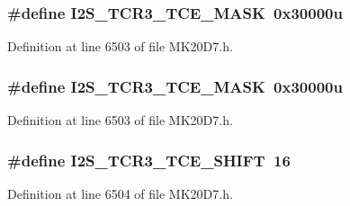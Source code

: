 \subsubsection[{\texorpdfstring{I2\+S\+\_\+\+T\+C\+R3\+\_\+\+T\+C\+E\+\_\+\+M\+A\+SK}{I2S_TCR3_TCE_MASK}}]{\setlength{\rightskip}{0pt plus 5cm}\#define I2\+S\+\_\+\+T\+C\+R3\+\_\+\+T\+C\+E\+\_\+\+M\+A\+SK~0x30000u}\hypertarget{group___i2_s___register___masks_ga27bcb7b4d391b96f7fd8f566579bf7e2}{}\label{group___i2_s___register___masks_ga27bcb7b4d391b96f7fd8f566579bf7e2}


Definition at line 6503 of file M\+K20\+D7.\+h.

\subsubsection[{\texorpdfstring{I2\+S\+\_\+\+T\+C\+R3\+\_\+\+T\+C\+E\+\_\+\+M\+A\+SK}{I2S_TCR3_TCE_MASK}}]{\setlength{\rightskip}{0pt plus 5cm}\#define I2\+S\+\_\+\+T\+C\+R3\+\_\+\+T\+C\+E\+\_\+\+M\+A\+SK~0x30000u}\hypertarget{group___i2_s___register___masks_ga27bcb7b4d391b96f7fd8f566579bf7e2}{}\label{group___i2_s___register___masks_ga27bcb7b4d391b96f7fd8f566579bf7e2}


Definition at line 6503 of file M\+K20\+D7.\+h.

\subsubsection[{\texorpdfstring{I2\+S\+\_\+\+T\+C\+R3\+\_\+\+T\+C\+E\+\_\+\+S\+H\+I\+FT}{I2S_TCR3_TCE_SHIFT}}]{\setlength{\rightskip}{0pt plus 5cm}\#define I2\+S\+\_\+\+T\+C\+R3\+\_\+\+T\+C\+E\+\_\+\+S\+H\+I\+FT~16}\hypertarget{group___i2_s___register___masks_gab6791fd5b9271db39f4f91173ed3c30d}{}\label{group___i2_s___register___masks_gab6791fd5b9271db39f4f91173ed3c30d}


Definition at line 6504 of file M\+K20\+D7.\+h.

